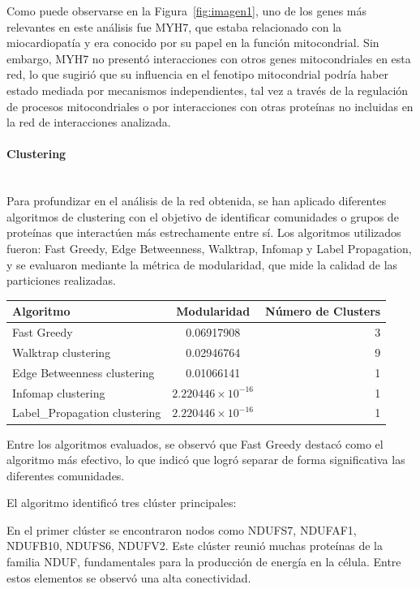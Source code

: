 Como puede observarse en la Figura~\ref{fig:imagen1}, uno de los genes más relevantes en este análisis fue MYH7, que estaba relacionado con la miocardiopatía y era conocido por su papel en la función mitocondrial. Sin embargo, MYH7 no presentó interacciones con otros genes mitocondriales en esta red, lo que sugirió que su influencia en el fenotipo mitocondrial podría haber estado mediada por mecanismos independientes, tal vez a través de la regulación de procesos mitocondriales o por interacciones con otras proteínas no incluidas en la red de interacciones analizada.

\paragraph{Clustering} \mbox{}\\

Para profundizar en el análisis de la red obtenida, se han aplicado diferentes algoritmos de clustering con el objetivo de identificar comunidades o grupos de proteínas que interactúen más estrechamente entre sí. Los algoritmos utilizados fueron: Fast Greedy, Edge Betweenness, Walktrap, Infomap y Label Propagation, y se evaluaron mediante la métrica de modularidad, que mide la calidad de las particiones realizadas.
\vspace{1em}

\begin{tabular}{|l|c|r|}
	\hline
	\textbf{Algoritmo} & \textbf{Modularidad} & \textbf{Número de Clusters} \\
	\hline
	Fast Greedy & 0.06917908 & 3 \\
	\hline
	Walktrap clustering & 0.02946764 & 9 \\
	\hline
	Edge Betweenness clustering & 0.01066141 & 1 \\
	\hline
	Infomap clustering & \(2.220446 \times 10^{-16}\) & 1 \\
	\hline
	Label\_Propagation clustering & \(2.220446 \times 10^{-16}\) & 1 \\
	\hline
\end{tabular}


\vspace{1em}
	

Entre los algoritmos evaluados, se observó que Fast Greedy destacó como el algoritmo más efectivo, lo que indicó que logró separar de forma significativa las diferentes comunidades.

El algoritmo identificó tres clúster principales:

En el primer clúster se encontraron nodos como NDUFS7, NDUFAF1, NDUFB10, NDUFS6, NDUFV2. Este clúster reunió muchas proteínas de la familia NDUF, fundamentales para la producción de energía en la célula. Entre estos elementos se observó una alta conectividad.

